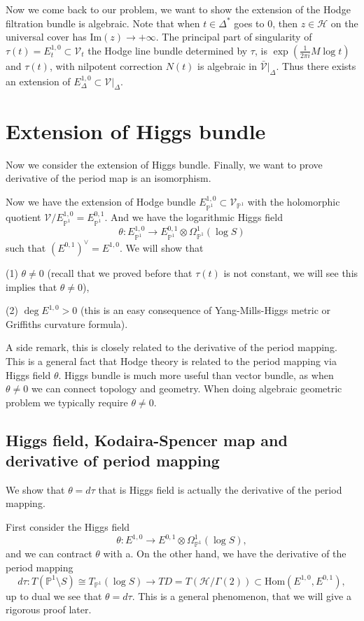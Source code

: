 \documentclass[11pt]{article}
\theoremstyle{definition}
\newcommand\PP{{\mathbb{P}}}
\begin{document}
Now we come back to our problem, we want to show the extension of the Hodge filtration bundle is algebraic. Note that when $t\in \Delta^* $ goes to $0$, then $z \in\mathscr{H}$ on the universal cover has $\text{Im}(z) \to +\infty$. 
The principal part of singularity of $\tau(t) = E^{1,0}_t \subset \mathcal{V}_t$ the Hodge line bundle determined by $\tau$, is $\exp(\frac{1}{2\pi i} M \log t)$ and $\tau(t)$, with nilpotent correction $N(t)$ is algebraic in $\bar{\mathcal{V}}|_{\Delta}$. Thus there exists an extension of $E^{1,0}_{\Delta} \subset \mathcal{V}|_{\Delta}$. 


\section{Extension of Higgs bundle}
Now we consider the extension of Higgs bundle. Finally, we want to prove derivative of the period map is an isomorphism.

Now we have the extension of Hodge bundle $E_{\PP^1}^{1,0} \subset \mathcal{V}_{\PP^1}$  with the holomorphic quotient $\mathcal{V}/E_{\PP^1}^{1,0} = E^{0,1}_{\PP^1}$. And we have the logarithmic Higgs field $$\theta: E^{1,0}_{\PP^1} \to E^{0,1}_{\PP^1} \otimes \Omega^1_{\PP^1}(\log S)$$such that $(E^{0,1})^\vee = E^{1,0}$. We will show that

(1) $\theta \ne 0$ (recall that we proved before that $\tau(t)$ is not constant, we will see this implies that $\theta \ne 0$),

(2) $\deg E^{1,0}>0 $ (this is an easy consequence of Yang-Mills-Higgs metric or Griffiths curvature formula).

A side remark, this is closely related to the derivative of the period mapping. This is a general fact that Hodge theory is related to the period mapping via Higgs field $\theta$. Higgs bundle is much more useful than vector bundle, as when $\theta \ne 0 $ we can connect topology and geometry. When doing algebraic geometric problem we typically require $\theta \ne 0$. 

\subsection{Higgs field, Kodaira-Spencer map and derivative of period mapping}
We show that $\theta = d\tau$ that is Higgs field is actually the derivative of the period mapping. 


First consider the Higgs field $$\theta : E^{1,0} \to E^{0,1} \otimes \Omega^1_{\PP^1}(\log S),$$and we can contract $\theta$ with a. On the other hand, we have the derivative of the period mapping $$d \tau : T(\PP^1 \setminus S) \cong T_{\PP^1}(\log S) \to TD = T(\mathscr{H}/\Gamma(2)) \subset \text{Hom}(E^{1,0},E^{0,1}),$$up to dual we see that $\theta =  d \tau$. This is a general phenomenon, that we will give a rigorous proof later.
\end{document}
